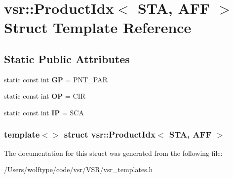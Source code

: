 \hypertarget{structvsr_1_1_product_idx_3_01_s_t_a_00_01_a_f_f_01_4}{\section{vsr\-:\-:Product\-Idx$<$ S\-T\-A, A\-F\-F $>$ Struct Template Reference}
\label{structvsr_1_1_product_idx_3_01_s_t_a_00_01_a_f_f_01_4}
}
\subsection*{Static Public Attributes}
\begin{DoxyCompactItemize}
\item 
\hypertarget{structvsr_1_1_product_idx_3_01_s_t_a_00_01_a_f_f_01_4_ad4e1f111d6e3bb455a774df60d1c27b9}{static const int {\bfseries G\-P} = P\-N\-T\-\_\-\-P\-A\-R}\label{structvsr_1_1_product_idx_3_01_s_t_a_00_01_a_f_f_01_4_ad4e1f111d6e3bb455a774df60d1c27b9}

\item 
\hypertarget{structvsr_1_1_product_idx_3_01_s_t_a_00_01_a_f_f_01_4_a20b5e421ecbb4ffe079344de11759961}{static const int {\bfseries O\-P} = C\-I\-R}\label{structvsr_1_1_product_idx_3_01_s_t_a_00_01_a_f_f_01_4_a20b5e421ecbb4ffe079344de11759961}

\item 
\hypertarget{structvsr_1_1_product_idx_3_01_s_t_a_00_01_a_f_f_01_4_a076144814726e51bbd8993010b563df4}{static const int {\bfseries I\-P} = S\-C\-A}\label{structvsr_1_1_product_idx_3_01_s_t_a_00_01_a_f_f_01_4_a076144814726e51bbd8993010b563df4}

\end{DoxyCompactItemize}
\subsubsection*{template$<$$>$ struct vsr\-::\-Product\-Idx$<$ S\-T\-A, A\-F\-F $>$}



The documentation for this struct was generated from the following file\-:\begin{DoxyCompactItemize}
\item 
/\-Users/wolftype/code/vsr/\-V\-S\-R/vsr\-\_\-templates.\-h\end{DoxyCompactItemize}
